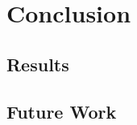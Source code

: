 \chapter{Conclusion}
\label{chapter:conclusion}

\section{Results}
\label{sec:results}

\section{Future Work}
\label{sec:futureWork}